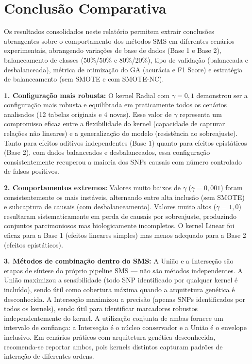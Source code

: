 \documentclass[12pt,a4paper]{article}
\newcommand{\novo}[1]{\textcolor{corNova}{#1}}
\begin{document}
\section{\novo{Conclusão Comparativa}}

\novo{Os resultados consolidados neste relatório permitem extrair conclusões abrangentes sobre o comportamento dos métodos SMS em diferentes cenários experimentais, abrangendo variações de base de dados (Base 1 e Base 2), balanceamento de classes (50\%/50\% e 80\%/20\%), tipo de validação (balanceada e desbalanceada), métrica de otimização do GA (acurácia e F1 Score) e estratégia de balanceamento (sem SMOTE e com SMOTE-NC).}

\novo{\textbf{1. Configuração mais robusta:} O kernel Radial com $\gamma = 0{,}1$ demonstrou ser a configuração mais robusta e equilibrada em praticamente todos os cenários analisados (12 tabelas originais e 4 novas). Esse valor de $\gamma$ representa um compromisso eficaz entre a flexibilidade do kernel (capacidade de capturar relações não lineares) e a generalização do modelo (resistência ao sobreajuste). Tanto para efeitos aditivos independentes (Base 1) quanto para efeitos epistáticos (Base 2), com dados balanceados e desbalanceados, essa configuração consistentemente recuperou a maioria dos SNPs causais com número controlado de falsos positivos.}

\novo{\textbf{2. Comportamentos extremos:} Valores muito baixos de $\gamma$ ($\gamma = 0{,}001$) foram consistentemente os mais instáveis, alternando entre alta inclusão (sem SMOTE) e subcaptura de causais (com desbalanceamento). Valores muito altos ($\gamma = 1{,}0$) resultaram sistematicamente em perda de causais por sobreajuste, produzindo conjuntos parcimoniosos mas biologicamente incompletos. O kernel Linear foi eficaz para a Base 1 (efeitos lineares simples) mas menos adequado para a Base 2 (efeitos epistáticos).}

\novo{\textbf{3. Métodos de combinação dentro do SMS:} A União e a Interseção são etapas de síntese do próprio pipeline SMS --- não são métodos independentes. A União maximizou a sensibilidade (todo SNP identificado por qualquer kernel é incluído), sendo útil como cobertura máxima quando a arquitetura genética é desconhecida. A Interseção maximizou a precisão (apenas SNPs identificados por todos os kernels), sendo útil para identificar marcadores robustos independentemente do kernel. A utilização conjunta de ambas fornece um intervalo de confiança: a Interseção é o núcleo conservador e a União é o envelope inclusivo. Em cenários práticos com arquitetura genética desconhecida, recomenda-se reportar ambos, pois kernels distintos capturam padrões de interação de diferentes ordens.}
\end{document}
